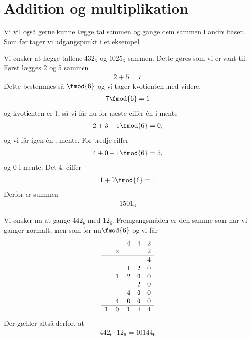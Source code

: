 \section*{Addition og multiplikation}

Vi vil også gerne kunne lægge tal sammen og gange dem sammen i andre baser. Som før tager vi udgangspunkt i et eksempel.
\begin{exa}	
	Vi ønsker at lægge tallene $432_6$ og $1025_6$ sammen. Dette gøres som vi er vant til. Først lægges 2 og 5 sammen
	\begin{align*}
		2 + 5 = 7
	\end{align*}
	Dette bestemmes så $\fmod{6}$ og vi tager kvotienten med videre.
	\begin{align*}
		7 \fmod{6} = 1
	\end{align*}
	og kvotienten er 1, så vi får nu for næste ciffer én i mente
	\begin{align*}
		2 + 3 + 1 \fmod{6} = 0,
	\end{align*}
	og vi får igen én i mente. For tredje ciffer
	\begin{align*}
		4 + 0 + 1 \fmod{6} = 5,
	\end{align*}
	og 0 i mente. 
	Det 4. ciffer
	\begin{align*}
		1 + 0  \fmod{6} = 1
	\end{align*}
	Derfor er summen 
	\begin{align*}
		1501_6
	\end{align*}
\end{exa}
\begin{exa}
	Vi ønsker nu at gange $442_6$ med $12_6$. Fremgangsmåden er den samme som når vi ganger normalt, men som før
	 nu$\fmod{6}$ og vi får
	 \begin{align*}
	\begin{array}{ccccc}
		& &	4&4&2\\
		&\times & & 1&2\\
		\hline
		& & & & 4 \\
		& & 1&2 &0 \\
		&1 &2 &0 &0 \\
		& & & 2 & 0 \\
		& &4 &0 &0 \\ 
		& 4& 0& 0&0\\
		\hline
		1& 0& 1&4 &4
	\end{array}
	\end{align*}
	Der gælder altså derfor, at 
	\begin{align*}
		442_6 \cdot 12_6 = 10144_6
	\end{align*}
\end{exa}


